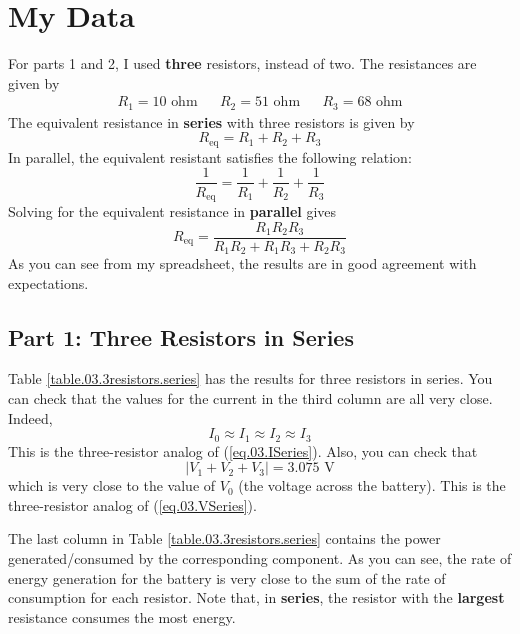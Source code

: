 \section{My Data}
%
For parts 1 and 2, I used \textbf{three} resistors, instead of two. The resistances are given by
\begin{align}
	R_{1} = 10 \text{ ohm} && R_{2} = 51 \text{ ohm} && R_{3} = 68 \text{ ohm}
\end{align}
The equivalent resistance in \textbf{series} with three resistors is given by
\begin{equation}
	R_{\text{eq}} = R_{1} + R_{2} + R_{3}
\end{equation}
In parallel, the equivalent resistant satisfies the following relation:
\begin{equation}
	\frac{1}{R_{\text{eq}}} = \frac{1}{R_{1}} + \frac{1}{R_{2}} + \frac{1}{R_{3}}
\end{equation}
Solving for the equivalent resistance in \textbf{parallel} gives
\begin{equation}
	R_{\text{eq}} = \frac{R_{1} R_{2} R_{3}}{R_{1} R_{2} + R_{1} R_{3} + R_{2} R_{3}}
\end{equation}
As you can see from my spreadsheet, the results are in good agreement with expectations.
%
\subsection{Part 1: Three Resistors in Series}
%
Table \ref{table.03.3resistors.series} has the results for three resistors in series. You can check that the values for the current in the third column are all very close. Indeed,
\begin{equation}
	I_{0} \approx I_{1} \approx I_{2} \approx I_{3}
\end{equation}
This is the three-resistor analog of (\ref{eq.03.ISeries}). Also, you can check that
\begin{equation}
	| V_{1} + V_{2} + V_{3} | = 3.075 \text{ V}
\end{equation}
which is very close to the value of $V_{0}$ (the voltage across the battery). This is the three-resistor analog of (\ref{eq.03.VSeries}).

The last column in Table \ref{table.03.3resistors.series} contains the power generated/consumed by the corresponding component. As you can see, the rate of energy generation for the battery is very close to the sum of the rate of consumption for each resistor. Note that, in \textbf{series}, the resistor with the \textbf{largest} resistance consumes the most energy.
%
